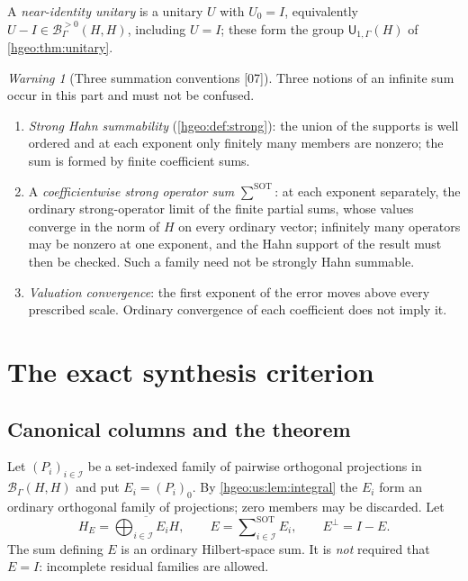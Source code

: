 \documentclass[11pt,letterpaper]{article}
\numberwithin{equation}{section}
\theoremstyle{definition}
\theoremstyle{remark}
\newtheorem{warning}[warning]{Warning}
\newcommand{\BH}{\mathscr B_\Gamma(H,H)}
\newcommand{\Bpos}[2]{\mathscr B^{>0}_\Gamma(#1,#2)}
\newcommand{\Un}{\mathsf U}
\newcommand{\src}[1]{\textup{\textsf{\small[#1]}}}
\newcommand{\sSOT}{\mathop{\sum}\nolimits^{\mathrm{SOT}}}
\begin{document}
A \emph{near-identity unitary} is a unitary $U$ with $U_0=I$, equivalently
$U-I\in\Bpos{H}{H}$, including $U=I$; these form the group
$\Un_{1,\Gamma}(H)$ of \cref{hgeo:thm:unitary}.

\begin{warning}[Three summation conventions \src{07}]\label{hgeo:us:warn:sums}
Three notions of an infinite sum occur in this part and must not be
confused.
\begin{enumerate}[label=\textup{(\alph*)}]
\item \emph{Strong Hahn summability} (\cref{hgeo:def:strong}): the union of the
supports is well ordered and at each exponent only finitely many members are
nonzero; the sum is formed by finite coefficient sums.
\item A \emph{coefficientwise strong operator sum} $\sSOT$: at each exponent
separately, the ordinary strong-operator limit of the finite partial sums,
whose values converge in the norm of $H$ on every ordinary vector; infinitely
many operators may be nonzero at one exponent, and the Hahn support of the
result must then be checked. Such a family need not be strongly Hahn
summable.
\item \emph{Valuation convergence}: the first exponent of the error moves
above every prescribed scale. Ordinary convergence of each coefficient does
not imply it.
\end{enumerate}
\end{warning}

\section{The exact synthesis criterion}\label{hgeo:us:sec:criterion}

\subsection{Canonical columns and the theorem}
Let $(P_i)_{i\in\mathcal I}$ be a set-indexed family of pairwise orthogonal
projections in $\BH$ and put $E_i=(P_i)_0$. By \cref{hgeo:us:lem:integral}
the $E_i$ form an ordinary orthogonal family of projections; zero members may
be discarded. Let
\[
 H_E=\overline{\bigoplus_{i\in\mathcal I}E_iH},\qquad
 E=\sSOT_{i\in\mathcal I}E_i,\qquad E^\perp=I-E .
\]
The sum defining $E$ is an ordinary Hilbert-space sum. It is \emph{not}
required that $E=I$: incomplete residual families are allowed.
\end{document}
